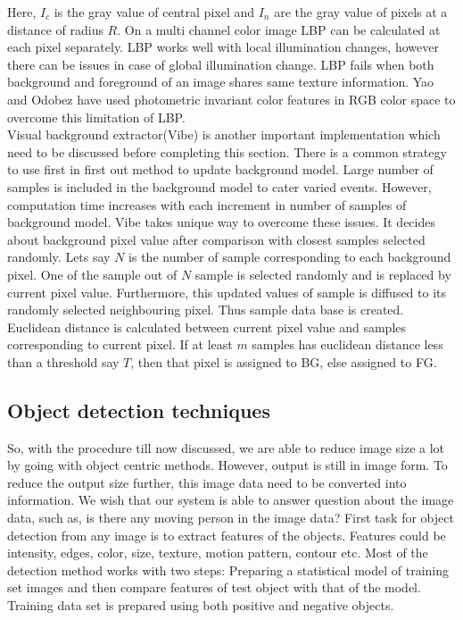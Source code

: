 \indent Here, $I_c$ is the gray value of central pixel and $I_n$ are the gray
value of pixels at a distance of radius $R$.  On a multi channel color
image LBP can be calculated at each pixel separately. LBP works well with
local illumination changes, however there can be issues in case of
global illumination change. LBP fails when both background and foreground
of an image shares same texture information. Yao and Odobez have used
photometric invariant color features in RGB color space to overcome this
limitation of LBP.\\

\indent Visual background extractor(Vibe) is another important
implementation which need to be discussed before completing this
section. There is a common strategy to use first in first out method to
update background model. Large number of samples is included in the
background model to cater varied events. However, computation time
increases with each increment in number of samples of background model.
Vibe takes unique way to overcome these issues. It decides about
background pixel value after comparison with closest samples selected
randomly. Lets say $N$ is the number of sample corresponding to each
background pixel. One of the sample out of $N$ sample is selected
randomly and is replaced by current pixel value. Furthermore, this
updated values of sample is diffused to its randomly selected
neighbouring pixel. Thus sample data base is created. Euclidean distance
is calculated between current pixel value and samples corresponding to
current pixel. If at least $m$ samples has euclidean distance less than
a threshold say $T$, then that pixel is assigned to BG, else assigned to
FG.\\

\subsection{Object detection techniques}
\indent So, with the procedure till now discussed, we are able to reduce
image size a lot by going with object centric methods. However, output
is still in image form. To reduce the output size further, this image
data need to be converted into information. We wish that our system is
able to answer question about the image data, such as, is there any
moving person in the image data? First task for object detection from
any image is to extract features of the objects. Features could be
intensity, edges, color, size, texture, motion pattern, contour etc.
Most of the detection method works with two steps: Preparing a
statistical model of training set images and then compare features of
test object with that of the model.  Training data set is prepared using
both positive and negative objects.\\

